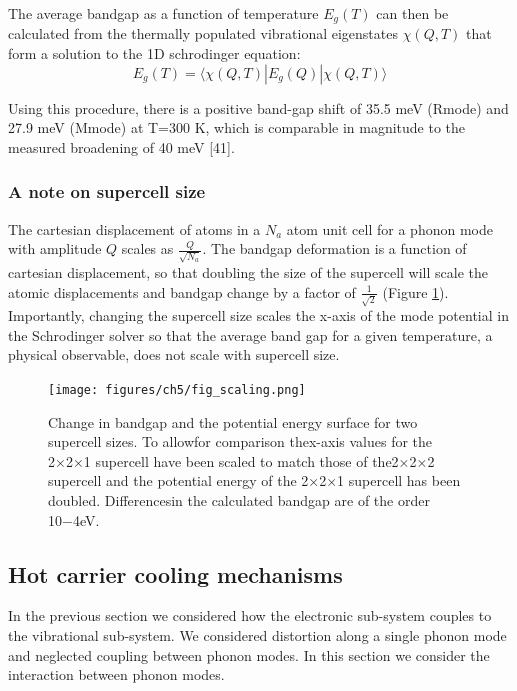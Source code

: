 The average bandgap as a function of temperature $E_g(T)$ can then be calculated from the thermally populated vibrational eigenstates $\chi(Q,T)$ that form a solution to the 1D schrodinger equation:
\begin{equation}
E_g(T) = \langle \chi(Q,T)|E_g(Q)|\chi(Q,T) \rangle
\end{equation}

Using this procedure, there is a positive band-gap shift of 35.5 meV (Rmode) and 27.9 meV (Mmode) at T=300 K, which is comparable in magnitude to the measured broadening of 40 meV [41]. 

\subsubsection{A note on supercell size}

The cartesian displacement of atoms in a $N_a$ atom unit cell for a phonon mode with amplitude $Q$ scales as $\frac{Q}{\sqrt{N_a}}$.\cite{}%
The bandgap deformation is a function of cartesian displacement, so that doubling the size of the supercell will scale the atomic displacements and bandgap change by a factor of $\frac{1}{\sqrt{2}}$ (Figure \ref{ch5scaling}).  %
Importantly, changing the supercell size scales the x-axis of the mode potential in the Schrodinger solver so that the average band gap for a given temperature, a physical observable, does not scale with supercell size.

\begin{figure}[]
\texttt{[image: figures/ch5/fig\_scaling.png]} \label{ch5scaling}
\caption[Bandgap deformation and supercell size]{
Change in bandgap and the potential energy surface for two supercell sizes.  To allowfor comparison thex-axis values for the 2×2×1 supercell have been scaled to match those of the2×2×2 supercell and the potential energy of the 2×2×1 supercell has been doubled.  Differencesin the calculated bandgap are of the order 10−4eV.
}
\end{figure}

\subsection{Hot carrier cooling mechanisms}
In the previous section we considered how the electronic sub-system couples to the vibrational sub-system. We considered distortion along a single phonon mode and neglected coupling between phonon modes. In this section we consider the interaction between phonon modes.

